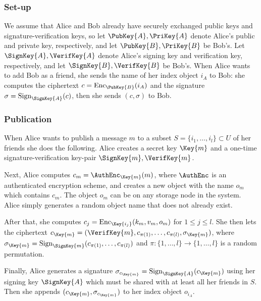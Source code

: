 \subsubsection{Set-up}

We assume that Alice and Bob already have securely exchanged public keys and 
signature-verification keys,
so let \(\PubKey{A}, \PriKey{A}\) denote Alice's public and private key, 
respectively, and let \(\PubKey{B}, \PriKey{B}\) be Bob's.
Let \(\SignKey{A}, \VerifKey{A}\) denote Alice's signing key and verification 
key, respectively, and let \(\SignKey{B}, \VerifKey{B}\) be Bob's.
When Alice wants to add Bob as a friend, she sends the name of her index object 
\(i_A\) to Bob:
she computes the ciphertext \(c = \Enc_{\PubKey{B}}( i_A )\) and the signature 
\(\sigma = \Sign_{\SignKey{A}}( c )\), then she sends \((c, \sigma)\) to Bob.

\subsubsection{Publication}

When Alice wants to publish a message \(m\) to a subset \(S = \{i_1, \ldots, 
  i_l\}\subset U\) of her friends she does the following.
Alice creates a secret key \(\Key{m}\) and a one-time signature-verification 
key-pair \(\SignKey{m}, \VerifKey{m}\).

Next, Alice computes \(c_m = \AuthEnc_{\Key{m}}( m )\), where \(\AuthEnc\) is 
an authenticated encryption scheme, and creates a new object with the name 
\(o_m\) which contains \(c_m\).
The object \(o_m\) can be on any storage node in the system.
Alice simply generates a random object name that does not already exist.

After that, she computes \(c_j = \Enc_{\Key{i_j}}( k_m, v_m, o_m )\) for 
\(1\leq j\leq l\).
She then lets the ciphertext \(c_{\Key{m}} = (\VerifKey{m}, c_{\pi(1)}, \ldots, 
  c_{\pi(l)}, \sigma_{\Key{m}})\), where \(\sigma_{\Key{m}} 
  = \Sign_{\SignKey{m}}( c_{\pi(1)}, \ldots, c_{\pi(l)} )\) and \(\pi\colon 
  \{1,\ldots,l\}\to \{1,\ldots,l\}\) is a random permutation.

Finally, Alice generates a signature \(\sigma_{c_{\Key{m}}} 
  = \Sign_{\SignKey{A}}( c_{\Key{m}} )\) using her signing key \(\SignKey{A}\) 
which must be shared with at least all her friends in \(S\).
Then she appends \((c_{\Key{m}}, \sigma_{c_{\Key{m}}})\) to her index object 
\(o_{i_A}\).

